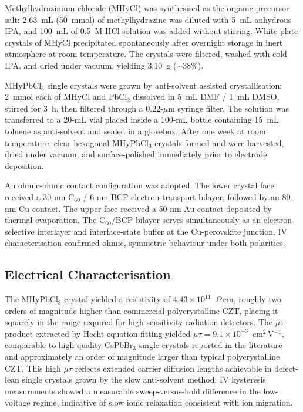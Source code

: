 Methylhydrazinium chloride (MHyCl) was synthesised as the organic
precursor salt: 2.63~mL (50~mmol) of methylhydrazine was diluted
with 5~mL anhydrous IPA, and 100~mL of 0.5~M HCl solution was
added without stirring.  White plate crystals of MHyCl
precipitated spontaneously after overnight storage in inert
atmosphere at room temperature.  The crystals were filtered,
washed with cold IPA, and dried under vacuum, yielding 3.10~g
($\sim$38\%).

MHyPbCl$_3$ single crystals were grown by anti-solvent assisted
crystallisation: 2~mmol each of MHyCl and PbCl$_2$ dissolved in
5~mL DMF / 1~mL DMSO, stirred for 3~h, then filtered through a
0.22-$\mu$m syringe filter.  The solution was transferred to a
20-mL vial placed inside a 100-mL bottle containing 15~mL toluene
as anti-solvent and sealed in a glovebox.  After one week at room
temperature, clear hexagonal MHyPbCl$_3$ crystals formed and
were harvested, dried under vacuum, and surface-polished
immediately prior to electrode deposition.

An ohmic-ohmic contact configuration was adopted.  The lower
crystal face received a 30-nm C$_{60}$ / 6-nm BCP
electron-transport bilayer, followed by an 80-nm Cu contact.
The upper face received a 50-nm Au contact deposited by thermal
evaporation.  The C$_{60}$/BCP bilayer serves simultaneously as
an electron-selective interlayer and interface-state buffer at
the Cu-perovskite junction.  IV characterisation confirmed ohmic,
symmetric behaviour under both polarities.

\subsection{Electrical Characterisation}
\label{sec:mhy_electrical}

The MHyPbCl$_3$ crystal yielded a resistivity of
$4.43 \times 10^{11}$~$\Omega$\,cm, roughly two orders of
magnitude higher than commercial polycrystalline CZT, placing
it squarely in the range required for high-sensitivity radiation
detectors.  The $\mu\tau$ product extracted by Hecht equation
fitting yielded $\mu\tau = 9.1 \times 10^{-3}$~cm$^2$\,V$^{-1}$,
comparable to high-quality CsPbBr$_3$ single crystals reported
in the literature~\cite{He2019CsPbBr} and approximately an order
of magnitude larger than typical polycrystalline CZT.  This high
$\mu\tau$ reflects extended carrier diffusion lengths achievable
in defect-lean single crystals grown by the slow anti-solvent
method.  IV hysteresis measurements showed a measurable
sweep-versus-hold difference in the low-voltage regime,
indicative of slow ionic relaxation consistent with ion migration.

